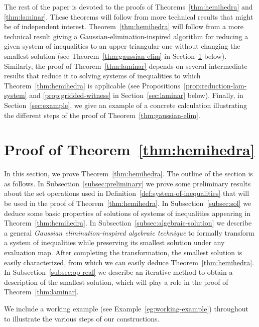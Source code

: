 \documentclass[10pt]{amsart}
\theoremstyle{plain}
\theoremstyle{definition}
\begin{document}
\medskip
The rest of the paper is devoted to the proofs of Theorems~\ref{thm:hemihedra} and \ref{thm:laminar}. 
These theorems will follow from more technical results that might be of independent interest.
Theorem~\ref{thm:hemihedra} will follow from a more technical result giving a Gaussian-elimination-inspired algorithm for reducing a given system of inequalities to an upper triangular one without changing the 
smallest solution (see Theorem~\ref{thm:gaussian-elim} in Section~\ref{sec:system-algebra} below). 
Similarly, the proof of Theorem~\ref{thm:laminar} depends on several intermediate results that reduce it to solving systems of inequalities to which Theorem~\ref{thm:hemihedra} is applicable (see Propositions~\ref{prop:reduction-lam-system} and \ref{prop:gridded-witness} in Section~\ref{sec:laminar} below). 
Finally, in Section~\ref{sec:example}, we give an example of a concrete
calculation illustrating the different steps of the proof of 
Theorem~\ref{thm:gaussian-elim}.

\section{Proof of Theorem~\ref{thm:hemihedra}}
\label{sec:system-algebra}

In this section, we prove Theorem~\ref{thm:hemihedra}. The outline of the section is as follows.
In Subsection~\ref{subsec:preliminary} we prove some preliminary results about the set operations used in Definition~\ref{def:system-of-inequalities} that will be used in the proof of Theorem~\ref{thm:hemihedra}. In Subsection~\ref{subsec:sol} we deduce some basic properties of solutions
of systems of inequalities appearing in Theorem~\ref{thm:hemihedra}.
In Subsection~\ref{subsec:algebraic-solution} we describe a general {\em Gaussian elimination-inspired algebraic technique} to formally transform a system of inequalities while preserving its smallest solution under any evaluation map.
After completing the transformation, the smallest solution is easily characterized, from which we can easily deduce Theorem~\ref{thm:hemihedra}.
In Subsection~\ref{subsec:op-real} 
we describe an iterative method
to obtain a description of 
the smallest solution,
which will play a role in the proof of Theorem~\ref{thm:laminar}. 



We include a working example (see Example~\ref{eg:working-example}) throughout to illustrate the various steps of our constructions.
\end{document}
